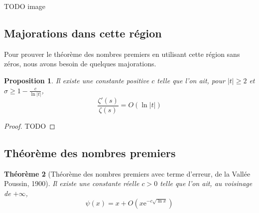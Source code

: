 \documentclass[french]{report}
\newtheorem{theorem}{Théorème}[section]
\newtheorem{proposition}[theorem]{Proposition}
\begin{document}
TODO image %

\subsection{Majorations dans cette région}

Pour prouver le théorème des nombres premiers en utilisant cette région sans zéros, nous avons besoin de quelques majorations.

\begin{proposition}\label{prop:majoration-zeta-zeta-prime-region-classique}
  Il existe une constante positive $c$ telle que l'on ait, pour $|t|\geq2$ et $\sigma\geq1-\frac{c}{\ln|t|}$,
  \[ \frac{\zeta'(s)}{\zeta(s)} = O(\ln|t|) \]
\end{proposition}

\begin{proof}
  TODO
\end{proof}

\subsection{Théorème des nombres premiers}

\begin{theorem}[Théorème des nombres premiers avec terme d'erreur, de la Vallée Poussin, 1900]\label{thm:tnp-terme-erreur-classique}
  Il existe une constante réelle $c>0$ telle que l'on ait, au voisinage de $+\infty$,
  \begin{equation}
    \psi(x)=x+O(x\mathrm{e}^{-c\sqrt{\ln x}})
  \end{equation}
\end{theorem}
\end{document}
